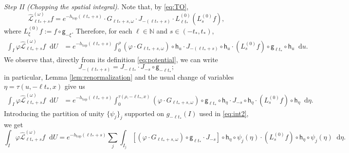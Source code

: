 \documentclass[11pt,letterpaper]{amsart}
\newcommand \cL {{\mathcal L}}
\newcommand \N {{ \mathbb N}}
\newcommand{\horo}{\mathsf{h}}
\newcommand{\geo}{\mathsf{g}}
\newcommand*{\diff}{\mathop{}\!\mathrm{d}}
\DeclareMathOperator{\topp}{top}
\theoremstyle{definition}
\begin{document}
\textit{Step II (Chopping the spatial integral)}. Note that, by \eqref{eq:TO},
\[
\hat\cL^{(\omega)}_{\ell {t_*}+s}f= e^{-h_{\topp}(\ell {t_*}+s)} \cdot G_{\ell {t_*}+s, \omega} \cdot J_{-(\ell {t_*}+s)} \cdot L^{(0)}_{\ell t_*}(L^{(0)}_{s}f),
\]
where $L^{(0)}_\xi f:=f\circ \geo_{-\xi}$.
Therefore, for each $\ell\in \N$ and $s\in (-t_*,t_*)$,
\begin{equation}\label{eq:integral5}
\begin{split}
\int_I \varphi \hat\cL^{(\omega)}_{\ell {t_*}+s}f \diff U&=
e^{-h_{\topp}(\ell {t_*}+s)} \int_0^{\rho} (\varphi\cdot  G_{\ell {t_*}+s, \omega}) \circ \horo_u \cdot J_{-(\ell {t_*}+s)} \circ \horo_u  \cdot (L^{(0)}_{s}f) \circ \geo_{\ell t_*}\circ \horo_u\diff u.
\end{split}
\end{equation}
We observe that, directly from its definition \eqref{eq:potential}, we can write
\[
J_{-(\ell {t_*}+s)} = J_{-\ell {t_*}} \cdot J_{-s} \circ \geo_{-\ell {t_*}};
\]
in particular, Lemma \ref{lem:renormalization} and the usual change of variables $\eta = \tau(u, -\ell t_*, x)$ give us
\[
\begin{split}
	\int_I \varphi \hat\cL^{(\omega)}_{\ell {t_*}+s}f \diff U&=
	e^{-h_{\topp}(\ell {t_*}+s)} \int_0^{\tau(\rho, -\ell t_*, x)} (\varphi\cdot  G_{\ell {t_*}+s, \omega}) \circ \geo_{\ell t_*} \circ \horo_{\eta} \cdot J_{-s} \circ \horo_{\eta}  \cdot (L^{(0)}_{s}f) \circ \horo_{\eta}\diff \eta.
\end{split}
\]
Introducing the partition of unity $\{\psi_j\}_j$ supported on $g_{-\ell t_*}(I)$ used in \eqref{eq:int2}, we get
\[
\int_I \varphi \hat\cL^{(\omega)}_{\ell {t_*}+s}f \diff U =
e^{-h_{\topp}(\ell {t_*}+s)}  \sum_{j} \int_{I_j} [(\varphi\cdot  G_{\ell {t_*}+s, \omega}) \circ \geo_{\ell t_*} \cdot J_{-s}]\circ \horo_{\eta} \circ \psi_j(\eta) \cdot (L^{(0)}_{s}f) \circ \horo_{\eta}\circ \psi_j(\eta) \diff \eta.
\]
\end{document}
